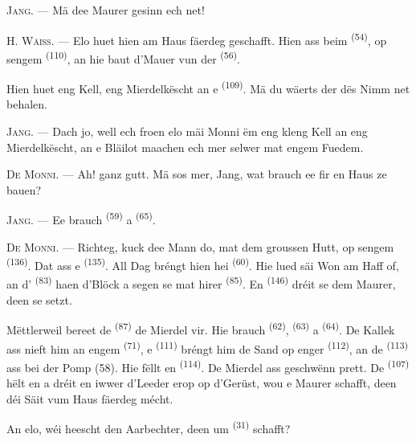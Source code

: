\textsc{Jang}. --- Mä dee Maurer gesinn ech net!

H. \textsc{Wäiss}. --- Elo huet hien am Haus fäerdeg geschafft. Hien ass beim
 \textsuperscript{(54)}, op sengem 
\textsuperscript{(110)}, an hie baut d'Mauer vun der 
\textsuperscript{(56)}.

Hien huet eng Kell, eng Mierdelkëscht an e  \textsuperscript{(109)}.
Mä du wäerts der dës Nimm net behalen.

\textsc{Jang}. --- Dach jo, well ech froen elo mäi Monni ëm eng kleng Kell an eng
Mierdelkëscht, an e Bläilot maachen ech mer selwer mat engem Fuedem.

\VUsaut{3.0mm}
\VUsaut{3.0mm}

\textsc{De Monni}. --- Ah! ganz gutt. Mä sos mer, Jang, wat brauch ee fir en Haus ze
bauen?

\textsc{Jang}. --- Ee brauch  \textsuperscript{(59)} a
 \textsuperscript{(65)}.

\textsc{De Monni}. --- Richteg, kuck dee Mann do, mat dem groussen Hutt, op sengem
 \textsuperscript{(136)}. Dat ass e 
\textsuperscript{(135)}. All Dag bréngt hien hei 
\textsuperscript{(60)}. Hie lued säi Won am Haff of, an d'
\textsuperscript{(83)} haen d'Blöck a segen se mat hirer 
\textsuperscript{(85)}. En  \textsuperscript{(146)} dréit se dem
Maurer, deen se setzt.

Mëttlerweil bereet de  \textsuperscript{(87)} de Mierdel vir.
Hie brauch  \textsuperscript{(62)},  \textsuperscript{(63)}
a  \textsuperscript{(64)}. De Kallek ass nieft him an engem
 \textsuperscript{(71)}, e  \textsuperscript{(111)}
bréngt him de Sand op enger  \textsuperscript{(112)}, an de
 \textsuperscript{(113)} ass bei der Pomp (58). Hie fëllt en
 \textsuperscript{(114)}. De Mierdel ass geschwënn prett. De
 \textsuperscript{(107)} hëlt en a dréit en iwwer d'Leeder erop
op d'Gerüst, wou e Maurer schafft, deen déi Säit vum Haus fäerdeg mécht.

An elo, wéi heescht den Aarbechter, deen um  \textsuperscript{(31)}
schafft?

